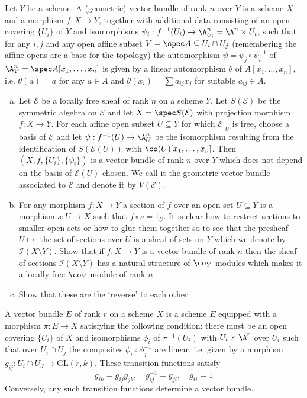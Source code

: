 \begin{exc}
Let $Y$ be a scheme. A (geometric) vector bundle of rank $n$ over $Y$ is a scheme $X$ and a morphism $f: X \to Y$, together with additional data consisting of an open covering $\{U_i\}$ of $Y$ and isomorphisms $\psi_i: f^{-1}(U_i) \to \A^n_{U_i}= \A^n \times U_i$, such that for any $i,j$ and any open affine subset $V=\spec A \subseteq U_i \cap U_j$ (remembering the affine opens are a base for the topology) the automorphism $\psi=\psi_j \circ \psi_i^{-1}$ of $\A^n_V=\spec A[x_1,\ldots,x_n]$ is given by a linear automorphism $\theta$ of $A[x_1,\ldots,x_n]$, i.e. $\theta(a)=a$ for any $a \in A$ and $\theta(x_i)=\sum a_{ij} x_j$ for suitable $a_{ij} \in A$. 
	\begin{enumerate}[(a)]
	\item Let $\mathcal{E}$ be a locally free sheaf of rank $n$ on a scheme $Y$. Let $S(\mathcal{E})$ be the symmetric algebra on $\mathcal{E}$ and let $X=\spec S(\mathcal{E})$ with projection morphism $f: X \to Y$. For each affine open subset $U \subseteq Y$ for which $\mathcal{E}\big|_U$ is free, choose a basis of $\mathcal{E}$ and let $\psi: f^{-1}(U) \to \A^n_U$ be the isomorphism resulting from the identification of $S(\mathcal{E}(U))$ with $\co(U)[x_1,\ldots,x_n]$. Then $(X,f,\{U_i\},\{\psi_i\})$ is a vector bundle of rank $n$ over $Y$ which does not depend on the basis of $\mathcal{E}(U)$ chosen. We call it the geometric vector bundle associated to $\mathcal{E}$ and denote it by $V(\mathcal{E})$.
	\item For any morphism $f: X \to Y$ a section of $f$ over an open set $U\subseteq Y$ is a morphism $s: U \to X$ such that $f \circ s=1_U$. It is clear how to restrict sections to smaller open sets or how to glue them together so to see that the presheaf $U \mapsto$ the set of sections over $U$ is a sheaf of sets on $Y$ which we denote by $\mathcal{I}(X\setminus Y)$. Show that if $f: X \to Y$ is a vector bundle of rank $n$ then the sheaf of sections $\mathcal{I}(X \setminus Y)$ has a natural structure of $\co_Y$-modules which makes it a locally free $\co_Y$-module of rank $n$.
	\item Show that these are the `reverse' to each other. 
	\end{enumerate}
\end{exc}


\begin{dfn}
A vector bundle $E$ of rank $r$ on a scheme $X$ is a scheme $E$ equipped with a morphism $\pi: E \to X$ satisfying the following condition: there must be an open covering $\{U_i\}$ of $X$ and isomorphisms $\phi_i$ of $\pi^{-1}(U_i)$ with $U_i \times \A^r$ over $U_i$ such that over $U_i \cap U_j$ the composites $\phi_i \circ \phi_j^{-1}$ are linear, i.e. given by a morphism $g_{ij}: U_i \cap U_J \to \text{GL}(r,k)$. These transition functions satisfy
	\[
	g_{ik}= g_{ij} g_{jk}, \quad g_{ij}^{-1}=g_{ji}, \quad g_{ii}=1
	\]
Conversely, any such transition functions determine a vector bundle. 
\end{dfn}


